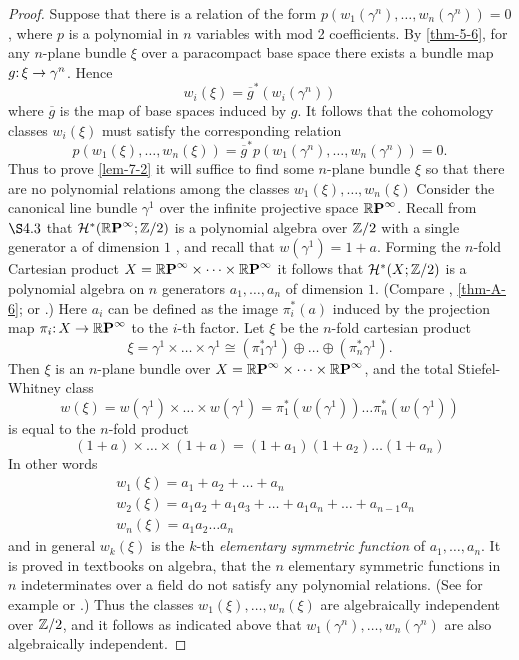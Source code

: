 \begin{proof}
	Suppose that there is a relation of the form $p(w_{1}(\gamma^{n}), \dots,w_{n}(\gamma^{n}))=0$, where $p$ is a polynomial in $n$ variables with mod 2 coefficients. By \cref{thm-5-6}, for any $n$-plane bundle $\xi$ over a paracompact base space there exists a bundle map $\map{g}{\xi}{\gamma^{n}}$. Hence
	\[
	w_{i}(\xi)=\overline{g}^{*}(w_{i}(\gamma^{n}))
	\]
	where $\overline{g}$ is the map of base spaces induced by $g$. It follows that the cohomology classes $w_{i}(\xi)$ must satisfy the corresponding relation
	\[
	p(w_{1}(\xi), \dots, w_{n}(\xi))=\overline{g}^{*} p(w_{1}(\gamma^{n}), \dots, w_{n}(\gamma^{n}))=0.
	\]
	Thus to prove \cref{lem-7-2} it will suffice to find some $n$-plane bundle $\xi$ so that there are no polynomial relations among the classes $w_{1}(\xi), \dots, w_{n}(\xi)$ Consider the canonical line bundle $\gamma^{1}$ over the infinite projective space $\boldsymbol{\mathbb{R}}\boldsymbol{\mathrm{P}}^{\infty} $. Recall from $\S 4.3$ that $\mathcal{H}^{*}(\boldsymbol{\mathbb{R}}\boldsymbol{\mathrm{P}}^{\infty} ; \mathbb{Z} / 2)$ is a polynomial algebra over $\mathbb{Z} / 2$ with a single generator a of dimension $1$ , and recall that $w(\gamma^{1})=1+a$. Forming the $n$-fold Cartesian product $X=\boldsymbol{\mathbb{R}}\boldsymbol{\mathrm{P}}^{\infty} \times \dots \times \boldsymbol{\mathbb{R}}\boldsymbol{\mathrm{P}}^{\infty}$ it follows that $\mathcal{H}^{*}(X ; \mathbb{Z} / 2)$ is a polynomial algebra on $n$ generators $a_{1}, \dots, a_{n}$ of dimension $1 $. (Compare , \cref{thm-A-6}; or \cite[p.~247]{57}.) Here  $a_{i}$ can be defined as the image $\pi_{i}^{*}(a)$ induced by the projection map $\map{\pi_{i}}{X}{\rp{\infty}}$ to the $i$-th factor. Let $\xi$ be the $n$-fold cartesian product
	\[
	\xi=\gamma^{1} \times \dots \times \gamma^{1} \cong(\pi_{1}^{*} \gamma^{1}) \oplus \dots \oplus(\pi_{n}^{*} \gamma^{1}).
	\]
	Then $\xi$ is an $n$-plane bundle over $X=\boldsymbol{\mathbb{R}}\boldsymbol{\mathrm{P}}^{\infty} \times \dots \times \boldsymbol{\mathbb{R}}\boldsymbol{\mathrm{P}}^{\infty}$, and the total Stiefel-Whitney class
	\[
	w(\xi)=w(\gamma^{1}) \times \dots \times w(\gamma^{1})=\pi_{1}^{*}(w(\gamma^{1})) \dots \pi_{n}^{*}(w(\gamma^{1}))
	\]
	is equal to the $n$-fold product
	\[
	(1+a) \times \dots \times(1+a)=(1+a_{1})(1+a_{2}) \dots(1+a_{n})
	\]
	In other words
\begin{align*}
		&w_{1}(\xi)=a_{1}+a_{2}+\dots+a_{n} \\
		&w_{2}(\xi)=a_{1} a_{2}+a_{1} a_{3}+\dots+a_{1} a_{n}+\dots+a_{n-1} a_{n} \\
		&w_{n}(\xi)=a_{1} a_{2} \dots a_{n}
	\end{align*}
	and in general $w_{k}(\xi)$ is the $k$-th \textit{elementary symmetric function} of $a_{1}, \dots, a_{n} $. It is proved in textbooks on algebra, that the $n$ elementary symmetric functions in $n$ indeterminates over a field do not satisfy any polynomial relations. (See for example  \cite[pp.~132-134]{76} or \cite[pp.~79,176]{75}.) Thus the classes $w_{1}(\xi), \dots, w_{n}(\xi)$ are algebraically independent over $\mathbb{Z} / 2$, and it follows as indicated above that $w_{1}(\gamma^{n}), \dots, w_{n}(\gamma^{n})$ are also algebraically independent.
\end{proof}\vspace{-.8cm}
